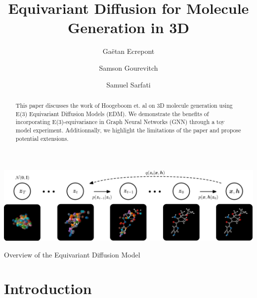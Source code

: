 \documentclass[sigconf]{acmart}
\begin{document}
\title{Equivariant Diffusion for Molecule Generation in 3D}

\author{Gaëtan Ecrepont}

\author{Samson Gourevitch}

\author{Samuel Sarfati}

\begin{abstract}
This paper discusses the work of Hoogeboom et. al \cite{edm} on 3D molecule generation using E(3) Equivariant Diffusion Models (EDM). We demonstrate the benefits of incorporating E(3)-equivariance in Graph Neural Networks (GNN) through a toy model experiment. Additionnally, we highlight the limitations of the paper and propose potential extensions.
\end{abstract}




\begin{teaserfigure}
  \includegraphics[width=\textwidth]{figures/overview_diffusion.pdf}
  \caption{Overview of the Equivariant Diffusion Model}
  \label{fig:teaser}
\end{teaserfigure}


\maketitle

\section{Introduction} %
\end{document}

